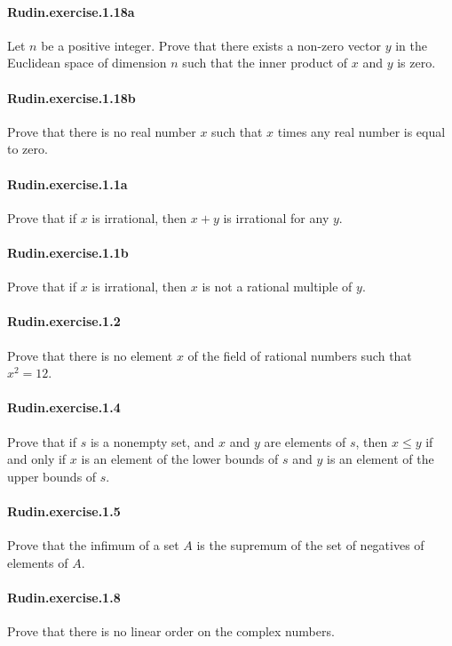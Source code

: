 \documentclass{article}
\begin{document}
\paragraph{Rudin.exercise.1.18a} Let $n$ be a positive integer. Prove that there exists a non-zero vector $y$ in the Euclidean space of dimension $n$ such that the inner product of $x$ and $y$ is zero.

\paragraph{Rudin.exercise.1.18b} Prove that there is no real number $x$ such that $x$ times any real number is equal to zero.

\paragraph{Rudin.exercise.1.1a} Prove that if $x$ is irrational, then $x+y$ is irrational for any $y$.

\paragraph{Rudin.exercise.1.1b} Prove that if $x$ is irrational, then $x$ is not a rational multiple of $y$.

\paragraph{Rudin.exercise.1.2} Prove that there is no element $x$ of the field of rational numbers such that $x^2 = 12$.

\paragraph{Rudin.exercise.1.4} Prove that if $s$ is a nonempty set, and $x$ and $y$ are elements of $s$, then $x \leq y$ if and only if $x$ is an element of the lower bounds of $s$ and $y$ is an element of the upper bounds of $s$.

\paragraph{Rudin.exercise.1.5} Prove that the infimum of a set $A$ is the supremum of the set of negatives of elements of $A$.

\paragraph{Rudin.exercise.1.8} Prove that there is no linear order on the complex numbers.
\end{document}
